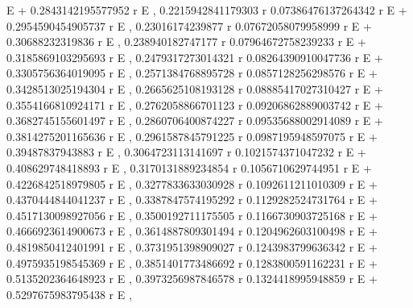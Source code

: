 \documentclass{article}
\begin{document}
    E                     + 0.2843142195577952 r E                     , 
     0.2215942841179303 r                         0.07386476137264342 r
    E                     + 0.2954590454905737 r E                     , 
     0.23016174239877 r                       0.07672058079958999 r
    E                   + 0.30688232319836 r E                     , 
     0.238940182747177 r                         0.07964672758239233 r
    E                    + 0.3185869103295693 r E                     , 
     0.2479317273014321 r                         0.08264390910047736 r
    E                     + 0.3305756364019095 r E                     , 
     0.2571384768895728 r                         0.0857128256298576 r
    E                     + 0.3428513025194304 r E                    , 
     0.2665625108193128 r                         0.08885417027310427 r
    E                     + 0.3554166810924171 r E                     , 
     0.2762058866701123 r                         0.09206862889003742 r
    E                     + 0.3682745155601497 r E                     , 
     0.2860706400874227 r                         0.09535688002914089 r
    E                     + 0.3814275201165636 r E                     , 
     0.2961587845791225 r                       0.0987195948597075 r
    E                     + 0.39487837943883 r E                    , 
     0.3064723113141697 r                        0.1021574371047232 r
    E                     + 0.408629748418893 r E                    , 
     0.3170131889234854 r                         0.1056710629744951 r
    E                     + 0.4226842518979805 r E                    , 
     0.3277833633030928 r                         0.1092611211010309 r
    E                     + 0.4370444844041237 r E                    , 
     0.3387847574195292 r                         0.1129282524731764 r
    E                     + 0.4517130098927056 r E                    , 
     0.3500192711175505 r                         0.1166730903725168 r
    E                     + 0.4666923614900673 r E                    , 
     0.3614887809301494 r                         0.1204962603100498 r
    E                     + 0.4819850412401991 r E                    , 
     0.3731951398909027 r                         0.1243983799636342 r
    E                     + 0.4975935198545369 r E                    , 
     0.3851401773486692 r                         0.1283800591162231 r
    E                     + 0.5135202364648923 r E                    , 
     0.3973256987846578 r                         0.1324418995948859 r
    E                     + 0.5297675983795438 r E                    , 
\end{document}
